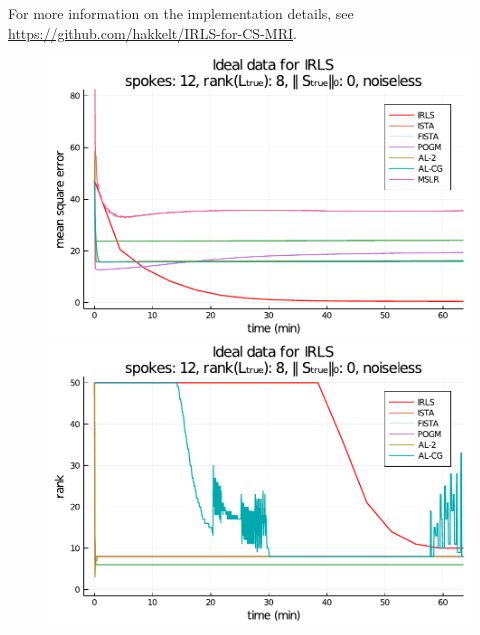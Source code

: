 For more information on the implementation details, see \url{https://github.com/hakkelt/IRLS-for-CS-MRI}.


\begin{figure}
    \centering
    \begin{minipage}{0.48\linewidth}
        \centering
        \includegraphics[width=\linewidth]{images/ideal_MSE.pdf}
    \end{minipage}
    \begin{minipage}{0.48\linewidth}
        \centering
        \includegraphics[width=\linewidth]{images/ideal_rank.pdf}

\end{minipage}
\end{figure}
